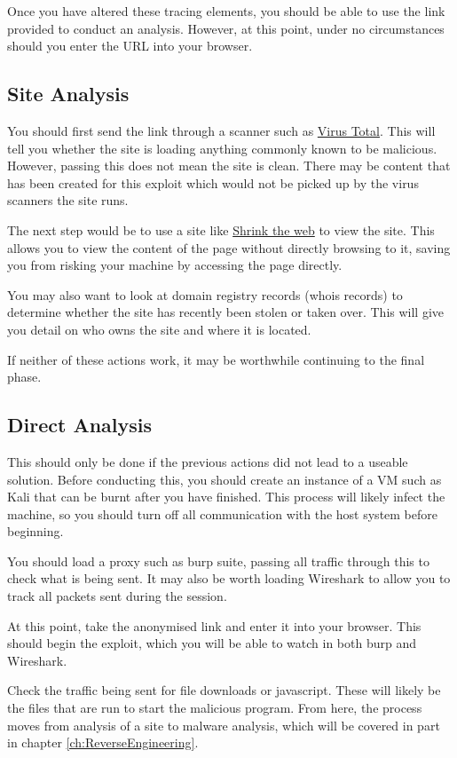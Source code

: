 			Once you have altered these tracing elements, you should be able to use the link provided to conduct an analysis.
			However, at this point, under no circumstances should you enter the URL into your browser.

		\subsection{Site Analysis}
			You should first send the link through a scanner such as \href{virustotal.com}{Virus Total}.
			This will tell you whether the site is loading anything commonly known to be malicious.
			However, passing this does not mean the site is clean.
			There may be content that has been created for this exploit which would not be picked up by the virus scanners the site runs.

			The next step would be to use a site like \href{shrinktheweb.com}{Shrink the web} to view the site.
			This allows you to view the content of the page without directly browsing to it,
			saving you from risking your machine by accessing the page directly.

			You may also want to look at domain registry records (whois records) to determine whether the site has recently been stolen or taken over.
			This will give you detail on who owns the site and where it is located.

			If neither of these actions work, it may be worthwhile continuing to the final phase.

		\subsection{Direct Analysis}
			This should only be done if the previous actions did not lead to a useable solution.
			Before conducting this, you should create an instance of a VM such as Kali that can be burnt after you have finished.
			This process will likely infect the machine, so you should turn off all communication with the host system before beginning.

			You should load a proxy such as burp suite, passing all traffic through this to check what is being sent.
			It may also be worth loading Wireshark to allow you to track all packets sent during the session.

			At this point, take the anonymised link and enter it into your browser.
			This should begin the exploit, which you will be able to watch in both burp and Wireshark.

			Check the traffic being sent for file downloads or javascript.
			These will likely be the files that are run to start the malicious program.
			From here, the process moves from analysis of a site to malware analysis, which will be covered in part in chapter \ref{ch:ReverseEngineering}.
